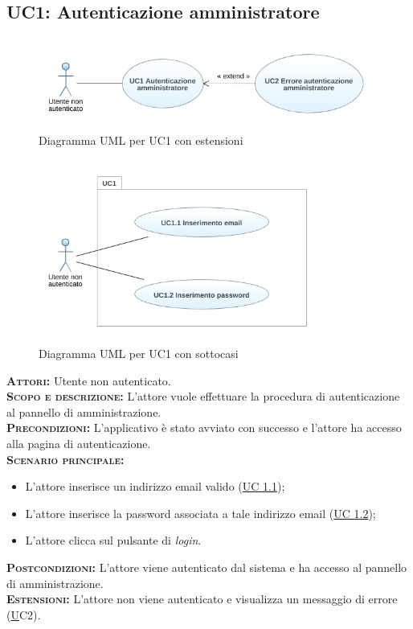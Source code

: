 \setlength{\parindent}{0cm}
\subsection{UC1: Autenticazione amministratore}
\label{sec:uc1}
\begin{figure}[h!]
    \centering
    \includegraphics[width=.8\textwidth]{figures/uc/uc1gen.png}
    \caption[Diagramma UML per UC1 con estensioni]{Diagramma UML per UC1 con estensioni
    \label{fig:uc1}}
\end{figure}   
\begin{figure}[h!]
    \centering
    \includegraphics[height=6cm]{figures/uc/uc1.png}
    \caption[Diagramma UML per UC1 con sottocasi]{Diagramma UML per UC1 con sottocasi
    \label{fig:uc1}}
\end{figure}   
\textsc{\textsc{\textbf{Attori:}}} Utente non autenticato.\\
\textsc{\textbf{Scopo e descrizione:}} L'attore vuole effettuare la procedura di autenticazione al pannello di amministrazione.\\
\textsc{\textsc{\textbf{Precondizioni:}}} L'applicativo è stato avviato con successo e l'attore ha accesso alla pagina di autenticazione.\\
\textsc{\textbf{Scenario principale:}}
\begin{itemize}
    \item L'attore inserisce un indirizzo email valido (\hyperref[sec:uc11]{UC 1.1});
    \item L'attore inserisce la password associata a tale indirizzo email (\hyperref[sec:uc12]{UC 1.2});
    \item L'attore clicca sul pulsante di \textit{login}.
\end{itemize}
\textsc{\textbf{Postcondizioni:}} L'attore viene autenticato dal sistema e ha accesso al pannello di amministrazione.\\
\textsc{\textbf{Estensioni:}} L'attore non viene autenticato e visualizza un messaggio di errore (\hyperref[sec:uc2]UC2{}).


